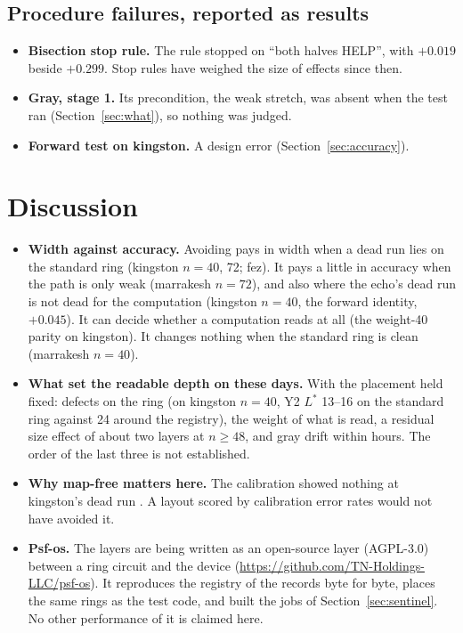 \documentclass[11pt]{article}
\begin{document}
\subsection{Procedure failures, reported as results}\label{sec:failures}
\begin{itemize}
\item \textbf{Bisection stop rule.} The rule stopped on ``both halves HELP'', with $+0.019$ beside $+0.299$. Stop rules
  have weighed the size of effects since then.
\item \textbf{Gray, stage 1.} Its precondition, the weak stretch, was absent when the test ran (Section~\ref{sec:what}),
  so nothing was judged.
\item \textbf{Forward test on kingston.} A design error (Section~\ref{sec:accuracy}).
\end{itemize}

\section{Discussion}
\begin{itemize}
\item \textbf{Width against accuracy.} Avoiding pays in width when a dead run lies on the standard ring (kingston
  $n=40$, 72; fez). It pays a little in accuracy when the path is only weak (marrakesh $n=72$), and also where the
  echo's dead run is not dead for the computation (kingston $n=40$, the forward identity, $+0.045$). It can decide
  whether a computation reads at all (the weight-40 parity on kingston). It changes nothing when the standard ring is
  clean (marrakesh $n=40$).
\item \textbf{What set the readable depth on these days.} With the placement held fixed: defects on the ring (on
  kingston $n=40$, Y2 $L^*$ 13--16 on the standard ring against 24 around the registry), the weight of what is read, a
  residual size effect of about two layers at $n\ge48$, and gray drift within hours. The order of the last three is not
  established.
\item \textbf{Why map-free matters here.} The calibration showed nothing at kingston's dead run \cite{paper5}. A layout
  scored by calibration error rates would not have avoided it.
\item \textbf{Psf-os.} The layers are being written as an open-source layer (AGPL-3.0) between a ring circuit and the
  device (\url{https://github.com/TN-Holdings-LLC/psf-os}). It reproduces the registry of the records byte for byte,
  places the same rings as the test code, and built the jobs of Section~\ref{sec:sentinel}. No other performance of it
  is claimed here.
\end{itemize}
\end{document}
